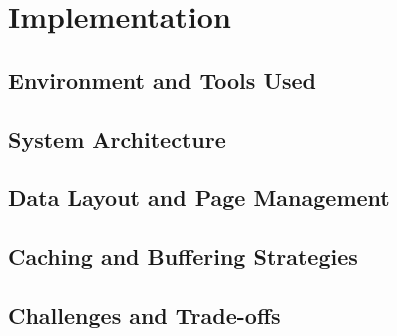 \chapter{Implementation}
\section{Environment and Tools Used}
\section{System Architecture}
\section{Data Layout and Page Management}
\section{Caching and Buffering Strategies}
\section{Challenges and Trade-offs}